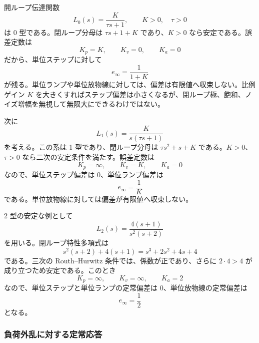 \begin{example}[型と標準入力に対する定常偏差]
開ループ伝達関数
\begin{equation}
  L_0(s)=\frac{K}{\tau s+1},
  \qquad K>0,\quad \tau>0
\end{equation}
は 0 型である。閉ループ分母は $\tau s+1+K$ であり、$K>0$ なら安定である。誤差定数は
\begin{equation}
  K_p=K,\qquad K_v=0,\qquad K_a=0
\end{equation}
だから、単位ステップに対して
\begin{equation}
  e_\infty=\frac{1}{1+K}
\end{equation}
が残る。単位ランプや単位放物線に対しては、偏差は有限値へ収束しない。比例ゲイン $K$ を大きくすればステップ偏差は小さくなるが、閉ループ極、飽和、ノイズ増幅を無視して無限大にできるわけではない。

次に
\begin{equation}
  L_1(s)=\frac{K}{s(\tau s+1)}
\end{equation}
を考える。この系は 1 型であり、閉ループ分母は $\tau s^2+s+K$ である。$K>0$、$\tau>0$ なら二次の安定条件を満たす。誤差定数は
\begin{equation}
  K_p=\infty,\qquad K_v=K,\qquad K_a=0
\end{equation}
なので、単位ステップ偏差は 0、単位ランプ偏差は
\begin{equation}
  e_\infty=\frac{1}{K}
\end{equation}
である。単位放物線に対しては偏差が有限値へ収束しない。

2 型の安定な例として
\begin{equation}
  L_2(s)=\frac{4(s+1)}{s^2(s+2)}
\end{equation}
を用いる。閉ループ特性多項式は
\begin{equation}
  s^2(s+2)+4(s+1)=s^3+2s^2+4s+4
\end{equation}
である。三次の Routh--Hurwitz 条件では、係数が正であり、さらに $2\cdot4>4$ が成り立つため安定である。このとき
\begin{equation}
  K_p=\infty,\qquad K_v=\infty,\qquad K_a=2
\end{equation}
なので、単位ステップと単位ランプの定常偏差は 0、単位放物線の定常偏差は
\begin{equation}
  e_\infty=\frac{1}{2}
\end{equation}
となる。
\end{example}

\subsubsection{負荷外乱に対する定常応答}

